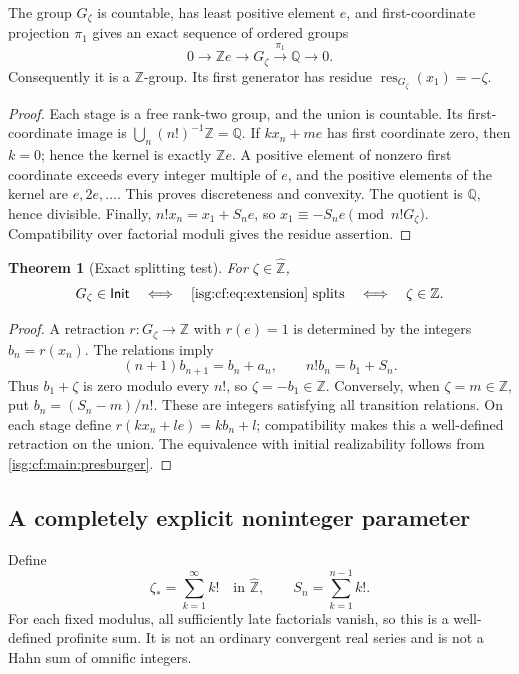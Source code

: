 \documentclass[11pt]{article}
\newtheorem{theorem}{Theorem}[section]
\theoremstyle{definition}
\theoremstyle{remark}
\newcommand{\Z}{\mathbb{Z}}
\newcommand{\Q}{\mathbb{Q}}
\newcommand{\Zhat}{\widehat{\Z}}
\newcommand{\IR}{\mathsf{Init}}
\newcommand{\res}{\operatorname{res}}
\begin{document}
\begin{proposition}\label{isg:cf:prop:family}
The group $G_\zeta$ is countable, has least positive element $e$, and
first-coordinate projection $\pi_1$ gives an exact sequence of ordered
groups
\begin{equation}\label{isg:cf:eq:extension}
 0\longrightarrow\Z e\longrightarrow G_\zeta
   \xrightarrow{\ \pi_1\ }\Q\longrightarrow0.
\end{equation}
Consequently it is a $\Z$-group. Its first generator has residue
$\res_{G_\zeta}(x_1)=-\zeta$.
\end{proposition}
\begin{proof}
Each stage is a free rank-two group, and the union is countable. Its
first-coordinate image is $\bigcup_n(n!)^{-1}\Z=\Q$.
If $kx_n+me$ has first coordinate zero, then $k=0$; hence the kernel is
exactly $\Z e$. A positive element of nonzero first coordinate exceeds
every integer multiple of $e$, and the positive elements of the kernel
are $e,2e,\ldots$. This proves discreteness and convexity.
The quotient is $\Q$, hence divisible. Finally,
$n!x_n=x_1+S_ne$, so $x_1\equiv-S_n e\pmod{n!G_\zeta}$.
Compatibility over factorial moduli gives the residue assertion.
\end{proof}

\begin{theorem}[Exact splitting test]\label{isg:cf:thm:familytest}
For $\zeta\in\Zhat$,
\[
 G_\zeta\in\IR\quad\Longleftrightarrow\quad
 \text{\eqref{isg:cf:eq:extension} splits}\quad\Longleftrightarrow\quad
 \zeta\in\Z.
\]
\end{theorem}
\begin{proof}
A retraction $r:G_\zeta\to\Z$ with $r(e)=1$ is determined by the
integers $b_n=r(x_n)$. The relations imply
\begin{equation}\label{isg:cf:eq:retraction}
 (n+1)b_{n+1}=b_n+a_n,
 \qquad n!b_n=b_1+S_n.
\end{equation}
Thus $b_1+\zeta$ is zero modulo every $n!$, so $\zeta=-b_1\in\Z$.
Conversely, when $\zeta=m\in\Z$, put
$b_n=(S_n-m)/n!$. These are integers satisfying all transition relations.
On each stage define $r(kx_n+le)=kb_n+l$; compatibility makes this a
well-defined retraction on the union. The equivalence with initial
realizability follows from \cref{isg:cf:main:presburger}.
\end{proof}

\subsection{A completely explicit noninteger parameter}
Define
\begin{equation}\label{isg:cf:eq:explicitparameter}
 \zeta_* =\sum_{k=1}^{\infty}k!\quad\text{in }\Zhat,
 \qquad S_n=\sum_{k=1}^{n-1}k!.
\end{equation}
For each fixed modulus, all sufficiently late factorials vanish, so
this is a well-defined profinite sum. It is not an ordinary convergent
real series and is not a Hahn sum of omnific integers.
\end{document}
